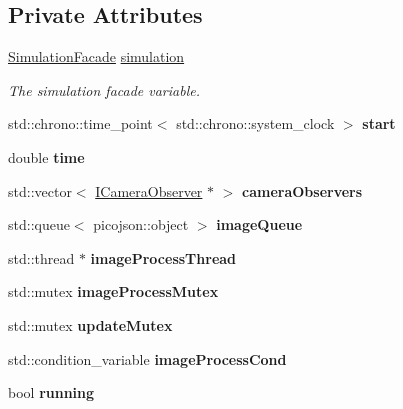\subsection*{Private Attributes}
\begin{DoxyCompactItemize}
\item 
\mbox{\label{classWebApp_a44d830c3509efde8ad1efdf28336106e}} 
\hyperlink{classSimulationFacade}{Simulation\+Facade} \hyperlink{classWebApp_a44d830c3509efde8ad1efdf28336106e}{simulation}
\begin{DoxyCompactList}\small\item\em The simulation facade variable. \end{DoxyCompactList}\item 
\mbox{\label{classWebApp_ade3b0d137c31bcaea60af469894b1371}} 
std\+::chrono\+::time\+\_\+point$<$ std\+::chrono\+::system\+\_\+clock $>$ {\bfseries start}
\item 
\mbox{\label{classWebApp_a09f8129ef8dee870e1a3bbd73186a5a8}} 
double {\bfseries time}
\item 
\mbox{\label{classWebApp_a5eec6ab504bdf96a950a672ae2ae5bc3}} 
std\+::vector$<$ \hyperlink{classICameraObserver}{I\+Camera\+Observer} $\ast$ $>$ {\bfseries camera\+Observers}
\item 
\mbox{\label{classWebApp_a87aeff57b477b3d59817ca4d75949e96}} 
std\+::queue$<$ picojson\+::object $>$ {\bfseries image\+Queue}
\item 
\mbox{\label{classWebApp_acd58315657b2a6730fb41f94dd1b3471}} 
std\+::thread $\ast$ {\bfseries image\+Process\+Thread}
\item 
\mbox{\label{classWebApp_a2af661a92e7115907feb4a7fdda5a541}} 
std\+::mutex {\bfseries image\+Process\+Mutex}
\item 
\mbox{\label{classWebApp_a127b6e2e0d8cba5c46c84b27937b5ce4}} 
std\+::mutex {\bfseries update\+Mutex}
\item 
\mbox{\label{classWebApp_a1b7510f19d30457f56949ce2baaa0307}} 
std\+::condition\+\_\+variable {\bfseries image\+Process\+Cond}
\item 
\mbox{\label{classWebApp_a89daa67e60f8fe89ef555ceaa3159f53}} 
bool {\bfseries running}
\end{DoxyCompactItemize}
